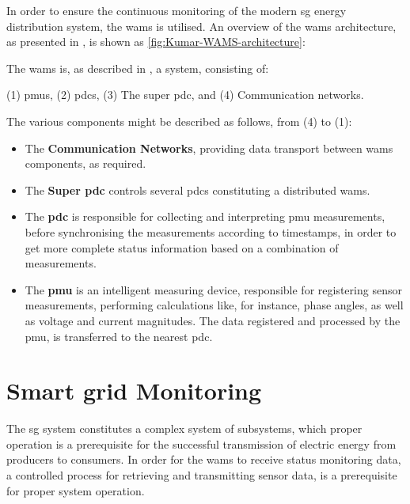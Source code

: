    

In order to ensure the continuous monitoring of the modern \acrlong{sg} energy distribution system, the \acrfull{wams} is utilised. An overview of the \acrshort{wams} architecture, as presented in   \cite{kumar2015monitoring}, is shown as \figureautorefname  { } \ref{fig:Kumar-WAMS-architecture}:

The \acrshort{wams} is, as described in  \cite{kumar2015monitoring}, a  system, consisting of:

(1) \acrshort{pmu}s, (2) \acrshort{pdc}s, (3) The super \acrshort{pdc}, and (4) Communication networks.

The various components might be described as follows, from (4) to (1):
\begin{itemize}
    \item The \textbf{Communication Networks}, providing data transport between \acrshort{wams} components, as required.
    \item The \textbf{Super \acrshort{pdc}} controls several \acrshort{pdc}s constituting a distributed \acrshort{wams}.
\item The \textbf{\acrfull{pdc}} is responsible for collecting and interpreting \acrshort{pmu} measurements, before synchronising the measurements according to timestamps, in order to get more complete status information based on a combination of measurements.
    \item The \textbf{\acrfull{pmu}} is an intelligent measuring device, responsible for registering sensor measurements,  performing calculations like, for instance, phase angles, as well as voltage and current magnitudes. The data registered and processed by the \acrshort{pmu}, is transferred to the nearest \acrshort{pdc}.
    \end{itemize}





\section{Smart grid Monitoring}
The \acrlong{sg} system constitutes a complex system of subsystems, which proper operation is a prerequisite for the successful transmission of electric energy from producers to consumers. 
In order for the \acrshort{wams} to receive status monitoring data, a controlled process for retrieving and transmitting sensor data, is a prerequisite for proper system operation.



